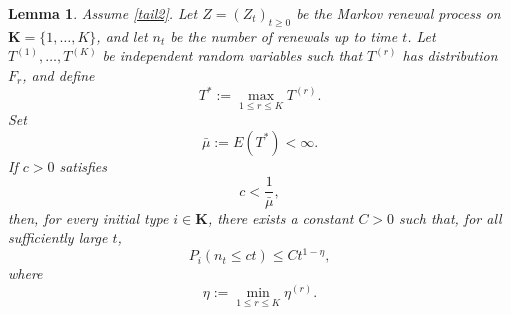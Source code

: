 \documentclass[reqno,final,11pt]{amsart}
\newcommand{\1}{\mathbbm{1}}
\theoremstyle{plain}
\newtheorem{lemma}[theorem]{Lemma}
\theoremstyle{definition}
\theoremstyle{remark}
\begin{document}
\begin{lemma}\label{lemma3.8}
Assume \eqref{tail2}. Let \(Z=(Z_t)_{t\ge0}\) be the Markov renewal process on
\(\mathbf K=\{1,\dots,K\}\), and let \(n_t\) be the number of renewals up to time \(t\).
Let \(T^{(1)},\dots,T^{(K)}\) be independent random variables such that \(T^{(r)}\) has
distribution \(F_r\), and define
\[
T^*:=\max_{1\le r\le K}T^{(r)}.
\]
Set
\[
\bar\mu:=E(T^*)<\infty.
\]
If \(c>0\) satisfies
\[
c<\frac1{\bar\mu},
\]
then, for every initial type \(i\in\mathbf K\), there exists a constant \(C>0\) such that,
for all sufficiently large \(t\),
\begin{equation}\label{cotan}
P_i(n_t\le ct)
\le
C t^{1-\eta},
\end{equation}
where
\[
\eta:=\min_{1\le r\le K}\eta^{(r)}.
\]
\end{lemma}
\end{document}
